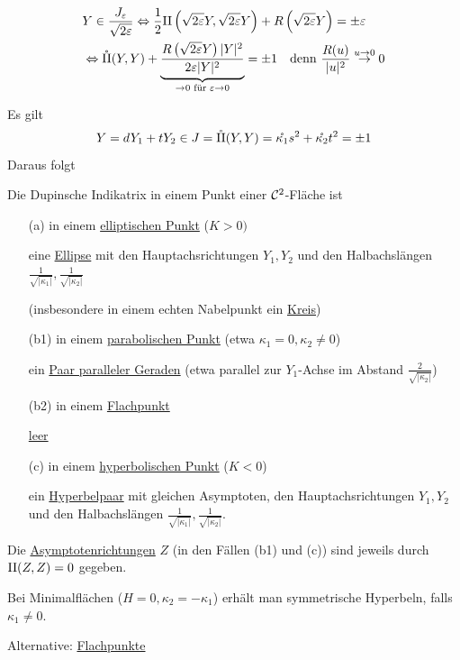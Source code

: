 \begin{beweis}
 \begin{align*}
  &Y \in \frac{J_\varepsilon}{\sqrt{2\varepsilon}} \Leftrightarrow \frac12 \Rom2 \left( \sqrt{2\varepsilon}Y, \sqrt{2\varepsilon}Y\right) + R\left(\sqrt{2\varepsilon} Y\right) = \pm \varepsilon \\
  &\Leftrightarrow \mathring{\Rom2}(Y,Y) + \underbrace{\frac{R\left(\sqrt{2\varepsilon}Y\right)|Y|^2}{2\varepsilon |Y|^2}}_{\to 0 \text{ für } \varepsilon \to 0} = \pm 1 \quad \text{denn } \frac{R(u)}{|u|^2} \stackrel {u \to 0}\to 0
 \end{align*}

\end{beweis}

Es gilt
\[
 Y = d Y_1 + t Y_2 \in J = \mathring{\Rom2}(Y,Y) = \mathring{\kappa_1}s^2 + \mathring{\kappa_2}t^2 = \pm 1
\]
Daraus folgt
\begin{satz}\label{satz235}
 Die Dupinsche Indikatrix in einem Punkt einer \(\mathcal{C}^2\)-Fläche ist
 \begin{enumerate}
  \item[(a)] in einem \uline{elliptischen Punkt} (\(K > 0)\) \par
  eine \uline{Ellipse} mit den Hauptachsrichtungen \(Y_1, Y_2\) und den Halbachslängen \(\frac{1}{\sqrt{|\kappa_1|}}, \frac{1}{\sqrt{|\kappa_2|}}\) \par
  (insbesondere in einem echten Nabelpunkt ein \uline{Kreis})
  \item[(b1)] in einem \uline{parabolischen Punkt} (etwa \(\kappa_1 = 0, \kappa_2 \ne 0\)) \par
  ein \uline{Paar paralleler Geraden} (etwa parallel zur \(Y_1\)-Achse im Abstand \(\frac{2}{\sqrt{|\kappa_2|}}\))
  \item[(b2)] in einem \uline{Flachpunkt} \par
  \uline{leer}
  \item[(c)] in einem \uline{hyperbolischen Punkt} (\(K < 0\)) \par
  ein \uline{Hyperbelpaar} mit gleichen Asymptoten, den Hauptachsrichtungen \(Y_1, Y_2\) und den Halbachslängen \(\frac{1}{\sqrt{|\kappa_1|}}, \frac{1}{\sqrt{|\kappa_2|}}\).
 \end{enumerate}
Die \uline{Asymptotenrichtungen} \(Z\) (in den Fällen (b1) und (c)) sind jeweils durch \(\Rom2(Z,Z) = 0\) gegeben.
\end{satz}

\begin{bemerkung}
 Bei Minimalflächen (\(H = 0, \kappa_2 = - \kappa_1\)) erhält man symmetrische Hyperbeln, falls \(\kappa_1 \ne 0\).\par
 Alternative: \uline{Flachpunkte}
\end{bemerkung}

